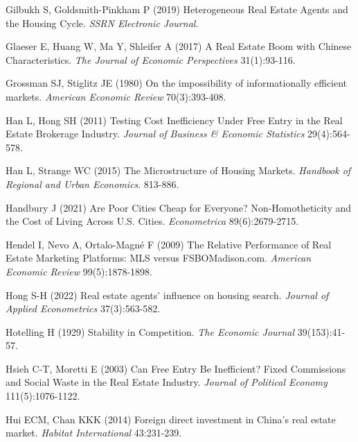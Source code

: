 \documentclass[11pt]{article}
\begin{document}
\begin{singlespace}
\begin{thebibliography}{}
Gilbukh S, Goldsmith-Pinkham P (2019) Heterogeneous Real Estate Agents and the Housing Cycle. \textit{SSRN Electronic Journal}.

Glaeser E, Huang W, Ma Y, Shleifer A (2017) A Real Estate Boom with Chinese Characteristics. \textit{The Journal of Economic Perspectives} 31(1):93-116.

Grossman SJ, Stiglitz JE (1980) On the impossibility of informationally efficient markets. \textit{American Economic Review} 70(3):393-408.

Han L, Hong SH (2011) Testing Cost Inefficiency Under Free Entry in the Real Estate Brokerage Industry. \textit{Journal of Business \& Economic Statistics} 29(4):564-578.

Han L, Strange WC (2015) The Microstructure of Housing Markets. \textit{Handbook of Regional and Urban Economics}. 813-886.

Handbury J (2021) Are Poor Cities Cheap for Everyone? Non-Homotheticity and the Cost of Living Across U.S. Cities. \textit{Econometrica} 89(6):2679-2715.

Hendel I, Nevo A, Ortalo-Magné F (2009) The Relative Performance of Real Estate Marketing Platforms: MLS versus FSBOMadison.com. \textit{American Economic Review} 99(5):1878-1898.

Hong S-H (2022) Real estate agents' influence on housing search. \textit{Journal of Applied Econometrics} 37(3):563-582.

Hotelling H (1929) Stability in Competition. \textit{The Economic Journal} 39(153):41-57.

Hsieh C-T, Moretti E (2003) Can Free Entry Be Inefficient? Fixed Commissions and Social Waste in the Real Estate Industry. \textit{Journal of Political Economy} 111(5):1076-1122.

Hui ECM, Chan KKK (2014) Foreign direct investment in China's real estate market. \textit{Habitat International} 43:231-239.


\end{thebibliography}
\end{singlespace}
\end{document}
